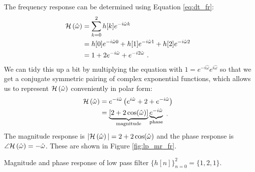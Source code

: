 The frequency response can be determined using Equation \ref{eq:dt_fr}:
\begin{align}
\mathcal{H}\left(\hat{\omega}\right) &= \sum_{k=0}^{2} h[k] e^{-i\hat{\omega}k}\\
    &= h[0]e^{-i\hat{\omega}0} + h[1]e^{-i\hat{\omega}1} + h[2]e^{-i\hat{\omega}2}\\
    &= 1 + 2 e^{-i\hat{\omega}} + e^{-i2\hat{\omega}} \,\,.
\end{align}
We can tidy this up a bit by multiplying the equation with
$1=e^{-i\hat{\omega}}e^{i\hat{\omega}}$ so that we get a conjugate
symmetric pairing of complex exponential functions, which allows us to
represent $\mathcal{H}\left(\hat{\omega}\right)$ conveniently in polar form:
\begin{align}
\mathcal{H}\left(\hat{\omega}\right) &=  e^{-i\hat{\omega}}\left(e^{i\hat{\omega}} + 2 + e^{-i\hat{\omega}}\right)\\
    &= \underbrace{[2+2\cos(\hat{\omega})]}_{\mathrm{magnitude}}\underbrace{e^{-i\hat{\omega}}}_{\mathrm{phase}} \,\, _.
\end{align}
The magnitude response is $|\mathcal{H}\left(\hat{\omega}\right)|=2+2\cos(\hat{\omega})$ and the phase
response is $\angle \mathcal{H}\left(\hat{\omega}\right) = -\hat{\omega}$. These are shown in
Figure \ref{fig:lp_mr_fr}.
\begin{marginfigure}
\begin{center}
\end{center}
\caption{Magnitude and phase response of low pass filter $\{h[n]\}_{n=0}^{2} = \{1,2,1\}$.}
\label{fig:lp_mr_fr}
\end{marginfigure}

